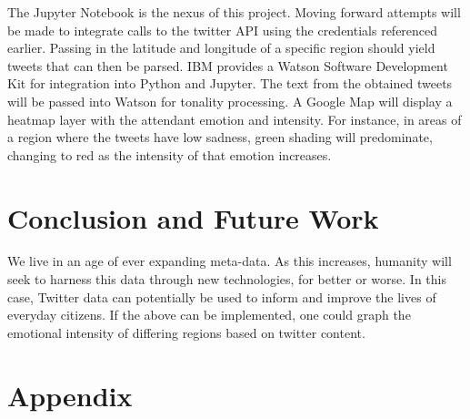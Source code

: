 \documentclass[12pt, oneside]{article}
\begin{document}
The Jupyter Notebook is the nexus of this project. Moving forward attempts will
be made to integrate calls to the twitter API using the credentials referenced
earlier. Passing in the latitude and longitude of a specific region should
yield tweets that can then be parsed. IBM provides a Watson Software
Development Kit for integration into Python and Jupyter. The text from the
obtained tweets will be passed into Watson for tonality processing. A Google
Map will display a heatmap layer with the attendant emotion and intensity. For
instance, in areas of a region where the tweets have low sadness, green shading
will predominate, changing to red as the intensity of that emotion increases.

\section{Conclusion and Future Work}
We live in an age of ever expanding meta-data. As this increases, humanity will
seek to harness this data through new technologies, for better or worse. In
this case, Twitter data can potentially be used to inform and improve the lives
of everyday citizens. If the above can be implemented, one could graph
the emotional intensity of differing regions based on twitter content.

\newpage{}


%


\newpage{}
\section{Appendix}
\end{document}
